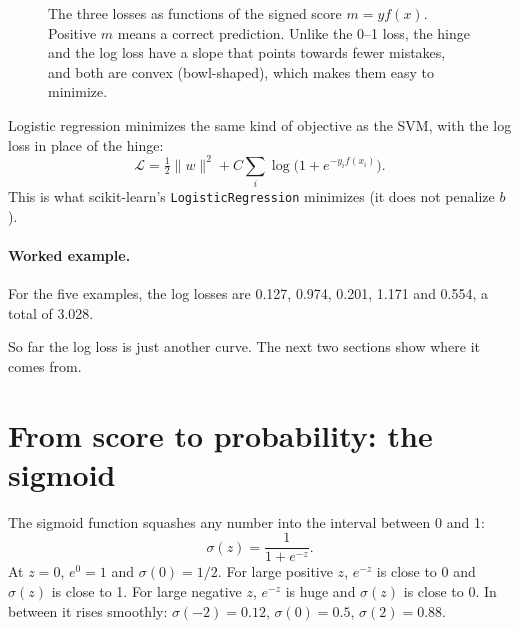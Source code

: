 \documentclass[11pt]{article}
\newcommand{\Loss}{\mathcal{L}}
\begin{document}
\begin{figure}[H]
\centering
{}
\caption{The three losses as functions of the signed score $m = y f(x)$. Positive $m$ means a correct
prediction. Unlike the 0--1 loss, the hinge and the log loss have a slope that points towards fewer
mistakes, and both are convex (bowl-shaped), which makes them easy to minimize.}
\label{fig:losses}
\end{figure}

Logistic regression minimizes the same kind of objective as the SVM, with the log loss in place of
the hinge:
\[
  \Loss = \tfrac12 \|w\|^2 + C \sum_i \log\bigl(1 + e^{-y_i f(x_i)}\bigr).
\]
This is what scikit-learn's \texttt{LogisticRegression} minimizes (it does not penalize $b$).

\paragraph{Worked example.} For the five examples, the log losses are 0.127, 0.974, 0.201, 1.171 and
0.554, a total of 3.028.

So far the log loss is just another curve. The next two sections show where it comes from.

\section{From score to probability: the sigmoid}\label{sec:sigmoid}

The sigmoid function squashes any number into the interval between 0 and 1:
\[
  \sigma(z) = \frac{1}{1 + e^{-z}} .
\]
At $z = 0$, $e^{0} = 1$ and $\sigma(0) = 1/2$. For large positive $z$, $e^{-z}$ is close to 0 and
$\sigma(z)$ is close to 1. For large negative $z$, $e^{-z}$ is huge and $\sigma(z)$ is close to 0. In
between it rises smoothly: $\sigma(-2) = 0.12$, $\sigma(0) = 0.5$, $\sigma(2) = 0.88$.
\end{document}
